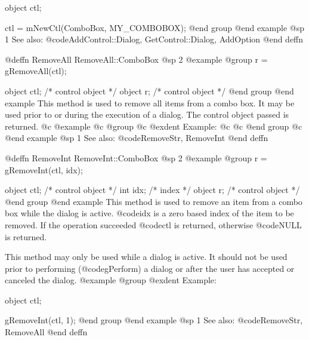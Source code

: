 object  ctl;

ctl = mNewCtl(ComboBox, MY_COMBOBOX);
@end group
@end example
@sp 1
See also:  @code{AddControl::Dialog, GetControl::Dialog, AddOption}
@end deffn




















@deffn {RemoveAll} RemoveAll::ComboBox
@sp 2
@example
@group
r = gRemoveAll(ctl);

object  ctl;    /*  control object  */
object  r;      /*  control object  */
@end group
@end example
This method is used to remove all items from a combo box.  It may be used
prior to or during the execution of a dialog.  The control object passed
is returned.
@c @example
@c @group
@c @exdent Example:
@c 
@c @end group
@c @end example
@sp 1
See also:  @code{RemoveStr, RemoveInt}
@end deffn

















@deffn {RemoveInt} RemoveInt::ComboBox
@sp 2
@example
@group
r = gRemoveInt(ctl, idx);

object  ctl;    /*  control object  */
int     idx;    /*  index           */
object  r;      /*  control object  */
@end group
@end example
This method is used to remove an item from a combo box while the dialog
is active.  @code{idx} is a zero based index of the item to be removed.
If the operation succeeded @code{ctl} is returned, otherwise @code{NULL}
is returned.

This method may only be used while a dialog is active.  It should not be
used prior to performing (@code{gPerform}) a dialog or after the user
has accepted or canceled the dialog.
@example
@group
@exdent Example:

object  ctl;

gRemoveInt(ctl, 1);
@end group
@end example
@sp 1
See also:  @code{RemoveStr, RemoveAll}
@end deffn














